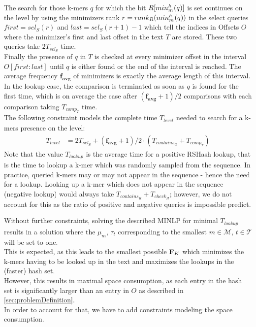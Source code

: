 \documentclass[a4paper,titlepage,onecolumn,oneside,12pt,nenglish,titlepage=firstiscover]{scrbook}
\theoremstyle{plain} %
\theoremstyle{definition} %
\theoremstyle{remark} %
\theoremstyle{plain}
\newcommand{\minimizerLength}{m}
\newcommand{\threshold}{t}
\newcommand{\kmer}{q}
\newcommand{\contains}{contains}
\newcommand{\rank}{rank}
\newcommand{\select}{sel}
\newcommand{\compare}{comp}
\newcommand{\timeForOperationOnStructure}[2]{T_{#1_{#2}}} %
\newcommand{\varAverageFrequency}{\textbf{f}_{\textbf{avg}}}
\newcommand{\possibleMinimizerLengths}{\mathcal{M}}
\newcommand{\possibleThresholds}{\mathcal{T}}
\newcommand{\indicatorm}{\mu}
\newcommand{\indicatort}{\tau}
\begin{document}
The search for those k-mers $\kmer$ for which the bit $R[\minimizerOf{\kmer}{}]$ is set continues on the level by using the minimizers rank  $r = \rank_R(\minimizerOf{\kmer}{})$ in the select queries $first = \select_S(r)$ and $last = \select_S(r+1)-1$ which tell the indices in Offsets $O$ where the minimizer’s first and last offset in the text $T$ are stored. These two queries take $2\timeForOperationOnStructure{\select}{S}$ time.\\
Finally the presence of $\kmer$ in $T$ is checked at every minimizer offset in the interval $O[first:last]$ until $\kmer$ is either found or the end of the interval is reached. The average frequency $\varAverageFrequency$ of \infrequent minimizers is exactly the average length of this interval. In the lookup case, the comparison is terminated as soon as $\kmer$ is found for the first time, which is on average the case after $(\varAverageFrequency+1)/2$ comparisons with each comparison taking $\timeForOperationOnStructure{\compare}{T}$ time.\\
The following constraint models the complete time $\timeForOperationOnStructure{level}{}$ needed to search for a k-mers presence on the level:
\newcommand{\levelTime}{\timeForOperationOnStructure{level}{} &= 2\timeForOperationOnStructure{\select}{S} + (\varAverageFrequency+1)/2 \cdot (\timeForOperationOnStructure{\contains}{O} + \timeForOperationOnStructure{\compare}{T})}
\begin{align}
	\levelTime \label{constraint:levelTime}
\end{align}
Note that the value $\timeForOperationOnStructure{lookup}{}$ is the average time for a positive RSHash lookup, that is the time to lookup a k-mer which was randomly sampled from the sequence. In practice, queried k-mers may or may not appear in the sequence - hence the need for a lookup. Looking up a k-mer which does not appear in the sequence (negative lookup) would always take $\timeForOperationOnStructure{\contains}{R} + \timeForOperationOnStructure{check}{H}$; however, we do not account for this as the ratio of positive and negative queries is impossible predict.

Without further constraints, solving the described MINLP for minimal $\timeForOperationOnStructure{lookup}{}$ results in a solution where the $\indicatorm_\minimizerLength$, $\indicatort_\threshold$ corresponding to the smallest $m \in \possibleMinimizerLengths$, $t \in \possibleThresholds$ will be set to one.\\
This is expected, as this leads to the smallest possible $\textbf{F}_{K}$ which minimizes the k-mers having to be looked up in the text and maximizes the lookups in the (faster) hash set.\\
However, this results in maximal space consumption, as each entry in the hash set is significantly larger than an entry in $O$ as described in \cref{sec:problemDefinition}.\\
In order to account for that, we have to add constraints modeling the space consumption.
\end{document}
